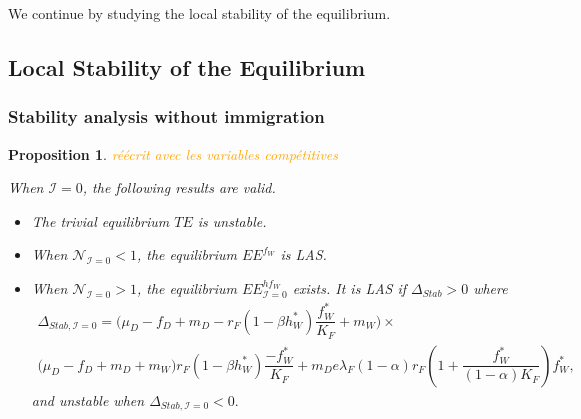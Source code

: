 \documentclass{article}
\newcommand{\lfw}{\lambda_{F}}
\newcommand{\lfw}{\lambda_{F}}
\newcommand{\cI}{\mathcal{I}}
\newcommand{\vdeux}[1]{\textcolor{orange}{#1}}
\newtheorem{prop}[theorem]{Proposition}
\theoremstyle{definition}
\theoremstyle{remark}
\begin{document}
We continue by studying the local stability of the equilibrium.

\subsection{Local Stability of the Equilibrium}

\subsubsection{Stability analysis without immigration}
\begin{prop}\label{prop:stab, cI=0}
\vdeux{réécrit avec les variables compétitives}

 When $\cI = 0$, the following results are valid.
\begin{itemize}
\item The trivial equilibrium $TE$ is unstable.
\item When $\mathcal{N}_{\cI = 0} < 1$, the equilibrium $EE^{f_W}$ is LAS.
\item When $\mathcal{N}_{\cI = 0} > 1$, the equilibrium $EE^{hf_W}_{\cI =0}$ exists. It is LAS if $\Delta_{Stab} > 0$ where 
\begin{multline*}
\Delta_{Stab, \cI =0} = \Big(\mu_D - f_D + m_D - r_F (1-\beta h_W^*) \dfrac{f_W^*}{K_F} + m_W\Big) \times \\ \big( \mu_D  -f_D + m_D + m_W \big) r_F(1 - \beta h_W^*) \dfrac{-f^*_W}{K_F} + 
m_D e \lfw (1- \alpha) r_F \left(1 + \dfrac{f_W^*}{(1- \alpha)K_F}\right) f_W^*,
\end{multline*}
and unstable when $\Delta_{Stab, \cI =0} < 0.$
\end{itemize}
\end{prop}
\end{document}
